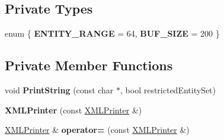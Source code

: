 \subsection*{Private Types}
\begin{DoxyCompactItemize}
\item 
enum \{ {\bfseries E\+N\+T\+I\+T\+Y\+\_\+\+R\+A\+N\+GE} = 64, 
{\bfseries B\+U\+F\+\_\+\+S\+I\+ZE} = 200
 \}\hypertarget{classtinyxml2_1_1XMLPrinter_ac9049bee10d230eb31ff7d146d538f7a}{}\label{classtinyxml2_1_1XMLPrinter_ac9049bee10d230eb31ff7d146d538f7a}

\end{DoxyCompactItemize}
\subsection*{Private Member Functions}
\begin{DoxyCompactItemize}
\item 
void {\bfseries Print\+String} (const char $\ast$, bool restricted\+Entity\+Set)\hypertarget{classtinyxml2_1_1XMLPrinter_a5495e504053f63f2c4d603327314fa91}{}\label{classtinyxml2_1_1XMLPrinter_a5495e504053f63f2c4d603327314fa91}

\item 
{\bfseries X\+M\+L\+Printer} (const \hyperlink{classtinyxml2_1_1XMLPrinter}{X\+M\+L\+Printer} \&)\hypertarget{classtinyxml2_1_1XMLPrinter_a157706836c056febc4022dc540a47982}{}\label{classtinyxml2_1_1XMLPrinter_a157706836c056febc4022dc540a47982}

\item 
\hyperlink{classtinyxml2_1_1XMLPrinter}{X\+M\+L\+Printer} \& {\bfseries operator=} (const \hyperlink{classtinyxml2_1_1XMLPrinter}{X\+M\+L\+Printer} \&)\hypertarget{classtinyxml2_1_1XMLPrinter_a7706d90e6cd31ef081742e8344b3f9bc}{}\label{classtinyxml2_1_1XMLPrinter_a7706d90e6cd31ef081742e8344b3f9bc}

\end{DoxyCompactItemize}
